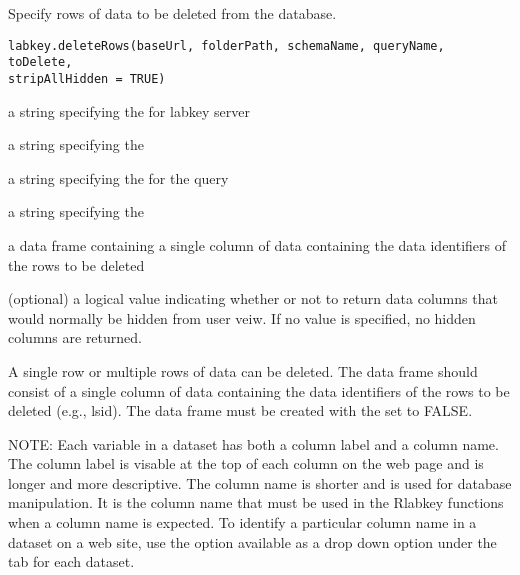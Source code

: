\documentclass{article}
\begin{document}
\begin{Description}\relax
Specify rows of data to be deleted from the database.
\end{Description}
\begin{Usage}
\begin{verbatim}
labkey.deleteRows(baseUrl, folderPath, schemaName, queryName, toDelete, 
stripAllHidden = TRUE)
\end{verbatim}
\end{Usage}
\begin{Arguments}
\begin{ldescription}
\item[\code{baseUrl}] a string specifying the for labkey server
\item[\code{folderPath}] a string specifying the 
\item[\code{schemaName}] a string specifying the   for the query
\item[\code{queryName}] a string specifying the  
\item[\code{toDelete}] a data frame containing a single column of data containing the data identifiers of the rows to be deleted
\item[\code{stripAllHidden}] (optional) a logical value indicating whether or not to return data columns that would 
normally be hidden from user veiw. If no value is specified, no hidden columns are returned.
\end{ldescription}
\end{Arguments}
\begin{Details}\relax
A single row or multiple rows of data can be deleted.  The  data frame should consist of a single 
column of data containing the data identifiers of the rows to be deleted (e.g., lsid).
The data frame must be created with the  set to FALSE.

NOTE: Each variable in a dataset has both a column label and a column name. The column label is visable at the top
of each column on the web page and is longer and more descriptive. The column name is shorter and is 
used  for database manipulation. It is the column name that must be used in
the Rlabkey functions when a column name is expected. To identify a particular column name in a dataset on
a web site, use the  option available as a drop down option under the  
tab for each dataset.
\end{Details}
\end{document}
